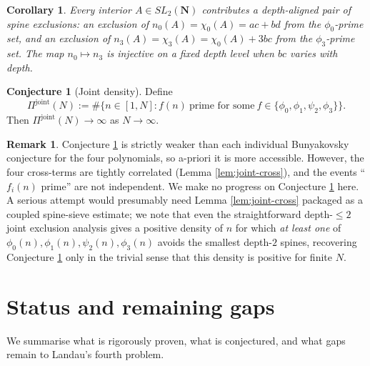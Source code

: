 \documentclass[11pt]{article}
\newtheorem{corollary}[theorem]{Corollary}
\theoremstyle{definition}
\newtheorem{remark}[theorem]{Remark}
\newtheorem{conjecture}[theorem]{Conjecture}
\newcommand{\N}{\mathbf{N}}
\newcommand{\SLN}{SL_2(\N)}
\begin{document}
\begin{corollary}\label{cor:phi0-phi3-coupling}
Every interior $A \in \SLN$ contributes a depth-aligned pair of spine exclusions: an exclusion of $n_0(A) = \chi_0(A) = ac+bd$ from the $\phi_0$-prime set, and an exclusion of $n_3(A) = \chi_3(A) = \chi_0(A) + 3bc$ from the $\phi_3$-prime set. The map $n_0 \mapsto n_3$ is injective on a fixed depth level when $bc$ varies with depth.
\end{corollary}

\begin{conjecture}[Joint density]\label{conj:joint-density}
Define
\[
\Pi^{\mathrm{joint}}(N) := \#\{n \in [1,N] : f(n)\ \text{prime for some}\ f \in \{\phi_0, \phi_1, \psi_2, \phi_3\}\}.
\]
Then $\Pi^{\mathrm{joint}}(N) \to \infty$ as $N \to \infty$.
\end{conjecture}

\begin{remark}
Conjecture \ref{conj:joint-density} is strictly weaker than each individual Bunyakovsky conjecture for the four polynomials, so a-priori it is more accessible. However, the four cross-terms are tightly correlated (Lemma \ref{lem:joint-cross}), and the events ``$f_i(n)$ prime'' are not independent. We make no progress on Conjecture \ref{conj:joint-density} here. A serious attempt would presumably need Lemma \ref{lem:joint-cross} packaged as a coupled spine-sieve estimate; we note that even the straightforward depth-$\le 2$ joint exclusion analysis gives a positive density of $n$ for which \emph{at least one} of $\phi_0(n), \phi_1(n), \psi_2(n), \phi_3(n)$ avoids the smallest depth-$2$ spines, recovering Conjecture \ref{conj:joint-density} only in the trivial sense that this density is positive for finite $N$.
\end{remark}

\section{Status and remaining gaps}\label{sec:status}

We summarise what is rigorously proven, what is conjectured, and what gaps remain to Landau's fourth problem.
\end{document}
